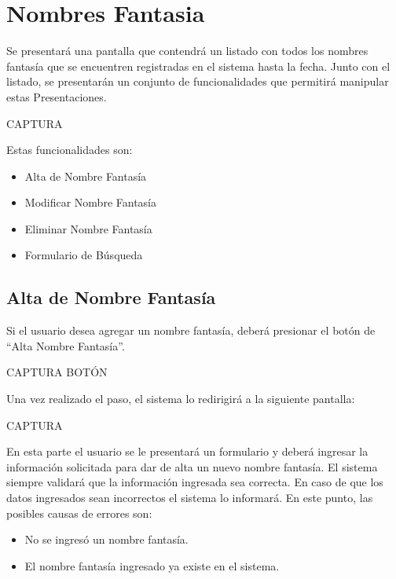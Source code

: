 \documentclass[letterpaper,10pt,spanish]{sphinxmanual}
\begin{document}
\section{Nombres Fantasia}
\label{nombresfantasia:nombres-fantasia}\label{nombresfantasia::doc}
Se presentará una pantalla que contendrá un listado con todos los nombres fantasía que se encuentren registradas en el sistema hasta la fecha. Junto con el listado, se presentarán un conjunto de funcionalidades que permitirá manipular estas Presentaciones.

CAPTURA

Estas funcionalidades son:
\begin{itemize}
\item {} 
Alta de Nombre Fantasía

\item {} 
Modificar Nombre Fantasía

\item {} 
Eliminar Nombre Fantasía

\item {} 
Formulario de Búsqueda

\end{itemize}


\subsection{Alta de Nombre Fantasía}
\label{nombresfantasia:alta-de-nombre-fantasia}
Si el usuario desea agregar un nombre fantasía, deberá presionar el botón de “Alta Nombre Fantasía”.

CAPTURA BOTÓN

Una vez realizado el paso, el sistema lo redirigirá a la siguiente pantalla:

CAPTURA

En esta parte el usuario se le presentará un formulario y deberá ingresar la información solicitada para dar de alta un nuevo nombre fantasía.
El sistema siempre validará que la información ingresada sea correcta. En caso de que los datos ingresados sean incorrectos el sistema lo informará.
En este punto, las posibles causas de errores son:
\begin{itemize}
\item {} 
No se ingresó un nombre fantasía.

\item {} 
El nombre fantasía ingresado ya existe en el sistema.

\end{itemize}
\end{document}
